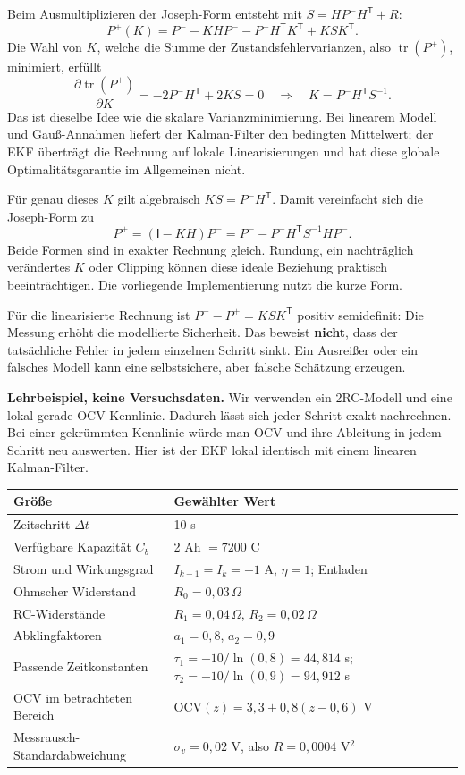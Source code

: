 Beim Ausmultiplizieren der Joseph-Form entsteht mit $S=HP^-H^{\mathsf T}+R$:
\[
P^+(K)=P^- -KHP^- -P^-H^{\mathsf T}K^{\mathsf T}+KSK^{\mathsf T}.
\]
Die Wahl von $K$, welche die Summe der Zustandsfehlervarianzen, also $\operatorname{tr}(P^+)$, minimiert, erfüllt
\[
\frac{\partial\operatorname{tr}(P^+)}{\partial K}
=-2P^-H^{\mathsf T}+2KS=0
\quad\Longrightarrow\quad K=P^-H^{\mathsf T}S^{-1}.
\]
Das ist dieselbe Idee wie die skalare Varianzminimierung. Bei linearem Modell und Gauß-Annahmen liefert der Kalman-Filter den bedingten Mittelwert; der EKF überträgt die Rechnung auf lokale Linearisierungen und hat diese globale Optimalitätsgarantie im Allgemeinen nicht.

Für genau dieses $K$ gilt algebraisch $KS=P^-H^{\mathsf T}$. Damit vereinfacht sich die Joseph-Form zu
\[
\boxed{P^+=(\mathsf I-KH)P^-
=P^- -P^-H^{\mathsf T}S^{-1}HP^-.}
\]
Beide Formen sind in exakter Rechnung gleich. Rundung, ein nachträglich verändertes $K$ oder Clipping können diese ideale Beziehung praktisch beeinträchtigen. Die vorliegende Implementierung nutzt die kurze Form.

Für die linearisierte Rechnung ist $P^--P^+=KSK^{\mathsf T}$ positiv semidefinit: Die Messung erhöht die modellierte Sicherheit. Das beweist \textbf{nicht}, dass der tatsächliche Fehler in jedem einzelnen Schritt sinkt. Ein Ausreißer oder ein falsches Modell kann eine selbstsichere, aber falsche Schätzung erzeugen.

\label{ecm:example}
\textbf{Lehrbeispiel, keine Versuchsdaten.} Wir verwenden ein 2RC-Modell und eine lokal gerade OCV-Kennlinie. Dadurch lässt sich jeder Schritt exakt nachrechnen. Bei einer gekrümmten Kennlinie würde man OCV und ihre Ableitung in jedem Schritt neu auswerten. Hier ist der EKF lokal identisch mit einem linearen Kalman-Filter.

\begin{tabular}{p{.38\linewidth}p{.51\linewidth}}
\toprule Größe & Gewählter Wert\\\midrule
Zeitschritt $\Delta t$ & 10 s\\
Verfügbare Kapazität $C_b$ & 2 Ah $=7200$ C\\
Strom und Wirkungsgrad & $I_{k-1}=I_k=-1$ A, $\eta=1$; Entladen\\
Ohmscher Widerstand & $R_0=0{,}03\,\Omega$\\
RC-Widerstände & $R_1=0{,}04\,\Omega$, $R_2=0{,}02\,\Omega$\\
Abklingfaktoren & $a_1=0{,}8$, $a_2=0{,}9$\\
Passende Zeitkonstanten & $\tau_1=-10/\ln(0{,}8)=44{,}814$ s; $\tau_2=-10/\ln(0{,}9)=94{,}912$ s\\
OCV im betrachteten Bereich & $\mathrm{OCV}(z)=3{,}3+0{,}8(z-0{,}6)$ V\\
Messrausch-Standardabweichung & $\sigma_v=0{,}02$ V, also $R=0{,}0004$ V$^2$\\\bottomrule
\end{tabular}

